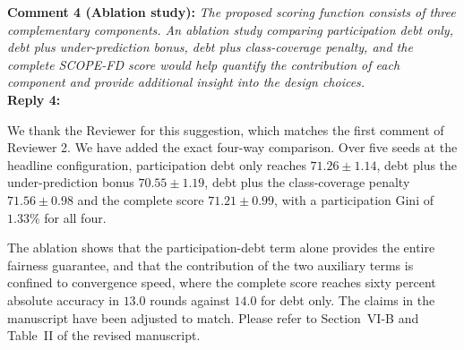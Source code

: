 \documentclass[10pt]{article}
\begin{document}
\noindent
\textbf{Comment 4 (Ablation study):} \textit{The proposed scoring function consists of three complementary components. An ablation study comparing participation debt only, debt plus under-prediction bonus, debt plus class-coverage penalty, and the complete SCOPE-FD score would help quantify the contribution of each component and provide additional insight into the design choices.} \\
\noindent
\textbf{Reply 4:} {We thank the Reviewer for this suggestion, which matches the first comment of Reviewer 2. We have added the exact four-way comparison. Over five seeds at the headline configuration, participation debt only reaches $71.26 \pm 1.14$, debt plus the under-prediction bonus $70.55 \pm 1.19$, debt plus the class-coverage penalty $71.56 \pm 0.98$ and the complete score $71.21 \pm 0.99$, with a participation Gini of $1.33\%$ for all four.

The ablation shows that the participation-debt term alone provides the entire fairness guarantee, and that the contribution of the two auxiliary terms is confined to convergence speed, where the complete score reaches sixty percent absolute accuracy in $13.0$ rounds against $14.0$ for debt only. The claims in the manuscript have been adjusted to match. Please refer to Section~VI-B and Table~II of the revised manuscript.}\\
\end{document}

